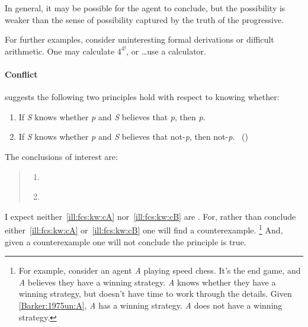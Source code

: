 \begin{note}
  In general, it may be possible for the agent to conclude, but the possibility is weaker than the sense of possibility captured by the truth of the progressive.

  For further examples, consider uninteresting formal derivations or difficult arithmetic.
  One may calculate \(4^{4!}\), or \dots\space use a calculator.
\end{note}

\paragraph*{Conflict}

\begin{note}

  \begin{scenario}%
    \label{ill:fcs:kw}%
    \citeauthor{Barker:1975un} suggests the following two principles hold with respect to knowing whether:

    \begin{enumerate}[label=(\Alph*), ref=(\Alph*), noitemsep]
    \item
      \label{Barker:1975un:A}
      If \emph{S} knows whether \emph{p} and \emph{S} believes that \emph{p}, then \emph{p}.
    \item
      \label{Barker:1975un:B}
      If \emph{S} knows whether \emph{p} and \emph{S} believes that not-\emph{p}, then not-\emph{p}.%
      \mbox{ }\hfill\mbox{(\citeyear[281]{Barker:1975un})}
    \end{enumerate}
  \end{scenario}

  \noindent The conclusions of interest are:

  \begin{quote}
  \begin{enumerate}[label=C\Alph*., ref=(C\Alph*), noitemsep]
  \item
    \label{ill:fcs:kw:cA}
  \item
    \label{ill:fcs:kw:cB}
  \end{enumerate}
\end{quote}

  \noindent I expect neither~\ref{ill:fcs:kw:cA} nor~\ref{ill:fcs:kw:cB} are .
  For, rather than conclude either~\ref{ill:fcs:kw:cA} or~\ref{ill:fcs:kw:cB} one will find a counterexample.%
  \footnote{
    For example, consider an agent \emph{A} playing speed chess.
    It's the end game, and \emph{A} believes they have a winning strategy.
    \emph{A} knows whether they have a winning strategy, but doesn't have time to work through the details.
    Given \ref{Barker:1975un:A}, \emph{A} has a winning strategy.
    \emph{A} does not have a winning strategy.
  }
  And, given a counterexample one will not conclude the principle is true.
\end{note}

